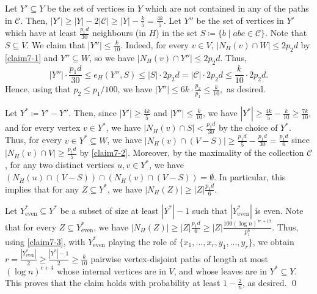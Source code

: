 \documentclass[10pt]{article}
\theoremstyle{plain}
\numberwithin{theorem}{section}
\theoremstyle{definition}
\theoremstyle{remark}
\renewenvironment{proof}[1][]{\begin{trivlist}
\item[\hspace{\labelsep}{\bf\noindent Proof#1.\/}] }{\qed\end{trivlist}}
\renewcommand{\setminus}{-}
\theoremstyle{plain}
\begin{document}
\begin{proof}[ of claim]
		Let $Y' \subseteq Y$ be the set of vertices in $Y$ which are not contained in any of the paths in $\mathcal{C}$. Then, $|Y'| \ge |Y| - 2|\mathcal{C}| \ge |Y| - \frac{k}{5} = \frac{4k}{5}$. 
		Let $Y''$ be the set of vertices in $Y'$ which have at least $\frac{p_1 d}{30}$ neighbours (in $H$) in the set $S \coloneqq \{ b \mid abc \in \mathcal{C} \}$. Note that $S \subseteq V$. We claim that $|Y''| \le \frac{k}{10}$. Indeed,  for every $v \in V$, $|N_H(v) \cap W| \le 2 p_2 d$ by \ref{claim7-1} and $Y'' \subseteq W$, so we have $|N_H(v) \cap Y''| \le 2 p_2 d$. Thus, 
		\begin{equation*}
			|Y''|\cdot \frac{p_1 d}{30} \le e_H(Y'',S) \le |S| \cdot 2p_2 d = |\mathcal{C}|\cdot 2p_2 d \le \frac{k}{10} \cdot 2p_2 d.
		\end{equation*}
		Hence, using that $p_2 \le p_1/100$, we have
		$|Y''| \le 6 k \cdot \frac{p_2}{p_1} \le \frac{k}{10},$ as desired. 
  
  Let $Y^* \coloneqq Y' \setminus Y''$. Then, since $|Y'| \ge \frac{4k}{5}$ and $|Y''| \le \frac{k}{10}$, we have $|Y^*| \ge \frac{4k}{5} - \frac{k}{10} \ge \frac{7 k}{10}$, and for every vertex $v \in Y^*$, we have $|N_H(v) \cap S| < \frac{p_1 d}{30}$ by the choice of $Y^*$. Thus, for every $v \in Y^* \subseteq W$, we have $|N_H(v) \cap (V \setminus S)| \ge \frac{p_1 d}{5} - \frac{p_1 d}{30} = \frac{p_1d}{6}$ since $|N_H(v) \cap V| \ge \frac{p_1 d}{5}$ by \ref{claim7-2}. Moreover, by the maximality of the collection $\mathcal{C}$, for any two distinct vertices $u, v \in Y^*$, we have $(N_H(u) \cap (V \setminus S)) \cap (N_H(v) \cap (V \setminus S)) = \emptyset$. In particular, this implies that for any $Z \subseteq Y^*$, we have $|N_H(Z)| \ge |Z|\frac{p_1 d}{6}$. 

	Let $Y^*_{\mathrm{even}} \subseteq Y^*$ be a subset of size at least $|Y^*|-1$ such that $|Y^*_{\mathrm{even}}|$ is even.
		Note that for every $Z \subseteq Y^*_{\mathrm{even}}$, we have $|N_H(Z)| \ge |Z|\frac{p_1 d}{6} \ge |Z| \frac{100 (\log n)^{7c+19}}{p_1^6}$. 
		Thus, using \ref{claim7-3}, with $Y^*_{\mathrm{even}}$ playing the role of $\{x_1, \ldots, x_r, y_1, \ldots, y_r\}$, we obtain $r = \frac{|Y^*_{\mathrm{even}}|}{2} \ge \frac{|Y^*|-1}{2} \ge \frac{k}{10}$ pairwise vertex-disjoint paths of length at most $(\log n)^{c+4}$ whose internal vertices are in $V$, and whose leaves are in $Y^* \subseteq Y$. 
		This proves that the claim holds with probability at least $1 - \frac{2}{n}$, as desired.
	\end{proof}
 
\end{document}
